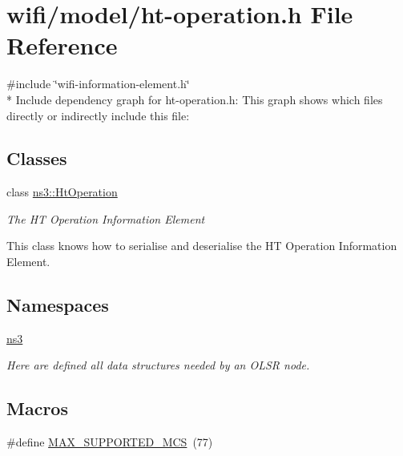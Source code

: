 \hypertarget{ht-operation_8h}{}\section{wifi/model/ht-\/operation.h File Reference}
\label{ht-operation_8h}
{\ttfamily \#include \char`\"{}wifi-\/information-\/element.\+h\char`\"{}}\\*
Include dependency graph for ht-\/operation.h\+:
This graph shows which files directly or indirectly include this file\+:
\subsection*{Classes}
\begin{DoxyCompactItemize}
\item 
class \hyperlink{classns3_1_1HtOperation}{ns3\+::\+Ht\+Operation}
\begin{DoxyCompactList}\small\item\em The HT Operation Information Element

This class knows how to serialise and deserialise the HT Operation Information Element. \end{DoxyCompactList}\end{DoxyCompactItemize}
\subsection*{Namespaces}
\begin{DoxyCompactItemize}
\item 
 \hyperlink{namespacens3}{ns3}
\begin{DoxyCompactList}\small\item\em Here are defined all data structures needed by an O\+L\+SR node. \end{DoxyCompactList}\end{DoxyCompactItemize}
\subsection*{Macros}
\begin{DoxyCompactItemize}
\item 
\#define \hyperlink{ht-operation_8h_a309e0519adb78c8fe6aed48ca762e21e}{M\+A\+X\+\_\+\+S\+U\+P\+P\+O\+R\+T\+E\+D\+\_\+\+M\+CS}~(77)
\end{DoxyCompactItemize}
